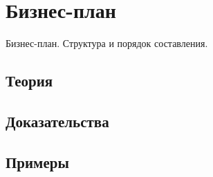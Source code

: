 
\section{Бизнес-план}
\label{sec:2.6.16-business-plan}

\begin{ticket}
Бизнес-план. Структура и порядок составления.
\end{ticket}

\subsection*{Теория}

\subsection*{Доказательства}

\subsection*{Примеры}
